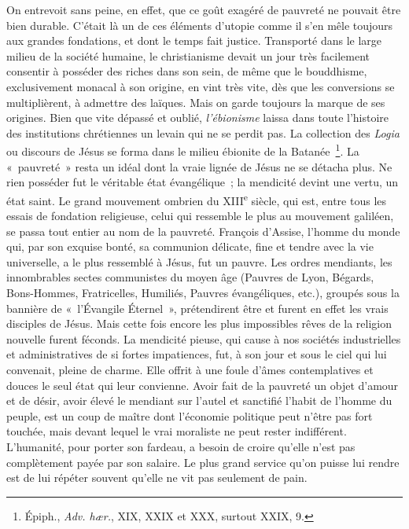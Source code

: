 \documentclass[french,twoside]{book} %
\begin{document}
On entrevoit sans peine, en effet, que ce goût exagéré de pauvreté ne pouvait être bien durable. C’était là un de ces éléments d’utopie comme il s’en mêle toujours aux grandes fondations, et dont le temps fait justice. Transporté dans le large milieu de la société humaine, le christianisme devait un jour très facilement consentir à posséder des riches dans son sein, de même que le bouddhisme, exclusivement monacal à son origine, en vint très vite, dès que les conversions se multiplièrent, à admettre des laïques. Mais on garde toujours la marque de ses origines. Bien que vite dépassé et oublié, {\itshape l’ébionisme} laissa dans toute l’histoire des institutions chrétiennes un levain qui ne se perdit pas. La collection des {\itshape Logia} ou discours de Jésus se forma dans le milieu ébionite de la Batanée \footnote{ Épiph., {\itshape Adv. hær.}, XIX, XXIX et XXX, surtout XXIX, 9.}. La « pauvreté » resta un idéal dont la vraie lignée de Jésus ne se détacha plus. Ne rien posséder fut le véritable état évangélique ; la mendicité devint une vertu, un état saint. Le grand mouvement ombrien du XIII\textsuperscript{e} siècle, qui est, entre tous les essais de fondation religieuse, celui qui ressemble le plus au mouvement galiléen, se passa tout entier au nom de la pauvreté. François d’Assise, l’homme du monde qui, par son exquise bonté, sa communion délicate, fine et tendre avec la vie universelle, a le plus ressemblé à Jésus, fut un pauvre. Les ordres mendiants, les innombrables sectes communistes du moyen âge (Pauvres de Lyon, Bégards, Bons-Hommes, Fratricelles, Humiliés, Pauvres évangéliques, etc.), groupés sous la bannière de « l’Évangile Éternel », prétendirent être et furent en effet les vrais disciples de Jésus. Mais cette fois encore les plus impossibles rêves de la religion nouvelle furent féconds. La mendicité pieuse, qui cause à nos sociétés industrielles et administratives de si fortes impatiences, fut, à son jour et sous le ciel qui lui convenait, pleine de charme. Elle offrit à une foule d’âmes contemplatives et douces le seul état qui leur convienne. Avoir fait de la pauvreté un objet d’amour et de désir, avoir élevé le mendiant sur l’autel et sanctifié l’habit de l’homme du peuple, est un coup de maître dont l’économie politique peut n’être pas fort touchée, mais devant lequel le vrai moraliste ne peut rester indifférent. L’humanité, pour porter son fardeau, a besoin de croire qu’elle n’est pas complètement payée par son salaire. Le plus grand service qu’on puisse lui rendre est de lui répéter souvent qu’elle ne vit pas seulement de pain.\par
\end{document}
